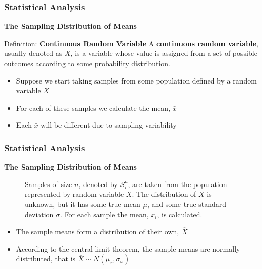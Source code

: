 \documentclass{beamer}
\begin{document}
\begin{frame}
\frametitle{Statistical Analysis}
\textbf{The Sampling Distribution of Means}
\vspace{0.2cm}
\begin{block}{Definition: \textbf{Continuous Random Variable}}
A \textbf{continuous random variable}, usually denoted as $X$, is a variable whose value is assigned from a set of possible outcomes according to some probability distribution.
\end{block}
\vspace{0.4cm}
\begin{itemize}
\item Suppose we start taking samples from some population defined by a random variable $X$
\vspace{0.4cm}
\item For each of these samples we calculate the mean, $\bar{x}$
\vspace{0.4cm}
\item Each $\bar{x}$ will be different due to sampling variability
\end{itemize}
\end{frame}

\begin{frame}
\frametitle{Statistical Analysis}
\textbf{The Sampling Distribution of Means}
\begin{figure}
\vspace{-0.3cm}
\caption{Samples of size $n$, denoted by $S_i^n$, are taken from the population represented by random variable $X$. The distribution of $X$ is unknown, but it has some true mean $\mu$, and some true standard deviation $\sigma$. For each sample the mean, $\bar{x_i}$, is calculated.}
\end{figure}
\vspace{-0.3cm}
\begin{itemize}
\item The sample means form a distribution of their own, $\overline{X}$
\vspace{0.1cm}
\item According to the central limit theorem, the sample means are normally distributed, that is $\overline{X} \sim N(\mu_{\bar{x}},\sigma_{\bar{x}})$
\vspace{0.1cm}
\end{itemize}
\end{frame}
\end{document}
